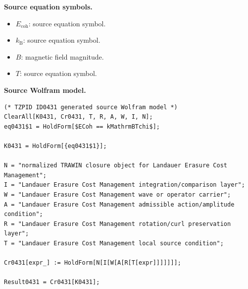 \begin{minipage}[t]{0.49\linewidth}
\begingroup
\small
\raggedright
\textbf{Source equation symbols.}\par
\begin{itemize}[leftmargin=1.35em,itemsep=1pt,topsep=1pt,parsep=0pt]
    \item $E_{\mathrm{coh}}$: source equation symbol.
    \item $k_{\mathrm{B}}$: source equation symbol.
    \item $B$: magnetic field magnitude.
    \item $T$: source equation symbol.
\end{itemize}
\endgroup
\end{minipage}\hfill
\begin{minipage}[t]{0.47\linewidth}
\begingroup
\scriptsize
\raggedright
\textbf{Source Wolfram model.}\par
\begin{Verbatim}[fontsize=\tiny,breaklines=true,breakanywhere=true]
(* TZPID ID0431 generated source Wolfram model *)
ClearAll[K0431, Cr0431, T, R, A, W, I, N];
eq0431$1 = HoldForm[$ECoh == kMathrmBTchi$];

K0431 = HoldForm[{eq0431$1}];

N = "normalized TRAWIN closure object for Landauer Erasure Cost Management";
I = "Landauer Erasure Cost Management integration/comparison layer";
W = "Landauer Erasure Cost Management wave or operator carrier";
A = "Landauer Erasure Cost Management admissible action/amplitude condition";
R = "Landauer Erasure Cost Management rotation/curl preservation layer";
T = "Landauer Erasure Cost Management local source condition";

Cr0431[expr_] := HoldForm[N[I[W[A[R[T[expr]]]]]]];

Result0431 = Cr0431[K0431];
\end{Verbatim}
\endgroup
\end{minipage}

